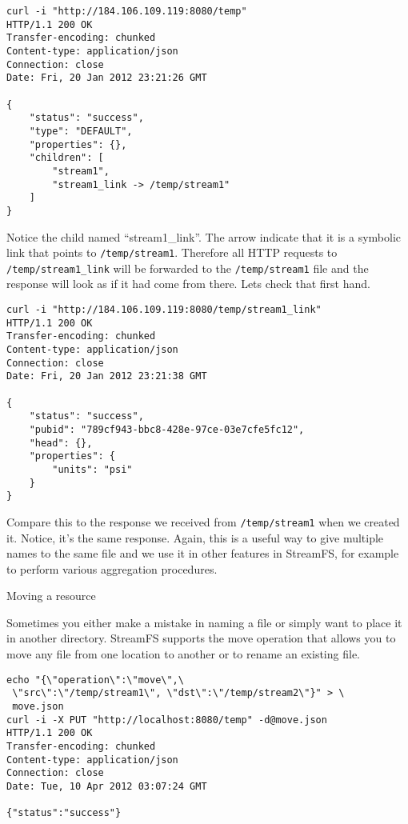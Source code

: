 \begin{lstlisting}
curl -i "http://184.106.109.119:8080/temp"
HTTP/1.1 200 OK
Transfer-encoding: chunked
Content-type: application/json
Connection: close
Date: Fri, 20 Jan 2012 23:21:26 GMT

{
    "status": "success",
    "type": "DEFAULT",
    "properties": {},
    "children": [
        "stream1",
        "stream1_link -> /temp/stream1"
    ]
}
\end{lstlisting}

Notice the child named ``stream1\_link''. The arrow indicate that it is a symbolic link that points to \texttt{/temp/stream1}. 
Therefore all HTTP requests to \texttt{/temp/stream1\_link} will be forwarded to the \texttt{/temp/stream1} file and the response 
will look as if it had come from there. Lets check that first hand.

\begin{lstlisting}
curl -i "http://184.106.109.119:8080/temp/stream1_link"
HTTP/1.1 200 OK
Transfer-encoding: chunked
Content-type: application/json
Connection: close
Date: Fri, 20 Jan 2012 23:21:38 GMT

{
    "status": "success",
    "pubid": "789cf943-bbc8-428e-97ce-03e7cfe5fc12",
    "head": {},
    "properties": {
        "units": "psi"
    }
}
\end{lstlisting}

Compare this to the response we received from \texttt{/temp/stream1} when we created it. Notice, it's the same response. Again, this is a useful way to give multiple names to the same file and we use it in other features in StreamFS, for example to perform various aggregation procedures.

Moving a resource

Sometimes you either make a mistake in naming a file or simply want to place it in another directory. StreamFS supports the move operation that allows you to move any file from one location to another or to rename an existing file.

\begin{lstlisting}
echo "{\"operation\":\"move\",\
 \"src\":\"/temp/stream1\", \"dst\":\"/temp/stream2\"}" > \
 move.json
curl -i -X PUT "http://localhost:8080/temp" -d@move.json
HTTP/1.1 200 OK
Transfer-encoding: chunked
Content-type: application/json
Connection: close
Date: Tue, 10 Apr 2012 03:07:24 GMT

{"status":"success"}
\end{lstlisting}


